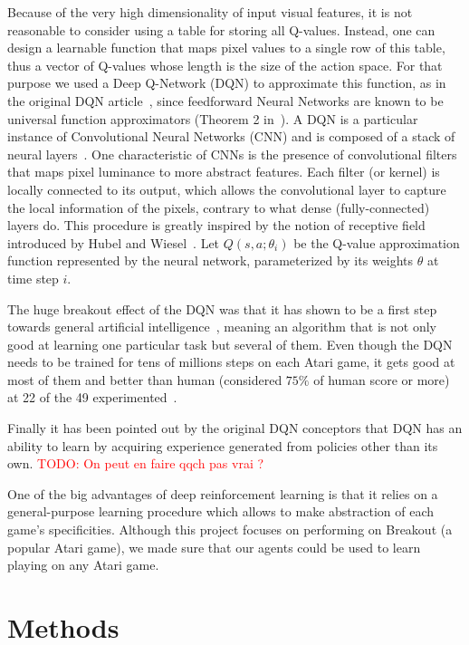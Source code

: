 \documentclass[letterpaper]{article}
\newcommand\todo[1]{\textcolor{red}{TODO: #1}}
\begin{document}
Because of the very high dimensionality of input visual features, it is not reasonable to consider using a table for storing all Q-values.
Instead, one can design a learnable function that maps pixel values to a single row of this table, thus a vector of Q-values whose length is the size
of the action space. For that purpose we used a Deep Q-Network (DQN) to approximate this function, as in the original DQN article~\citep{mnih2015human}, since feedforward Neural Networks
are known to be universal function approximators (Theorem 2 in~\cite{hornik1991approximation}).
A DQN is a particular instance of Convolutional Neural Networks (CNN) and is composed of a stack of neural layers~\citep{lecun1998gradient}. One characteristic of CNNs is the
presence of convolutional filters that maps pixel luminance to more abstract features. Each filter (or kernel) is locally connected to its output, which
allows the convolutional layer to capture the local information of the pixels, contrary to what dense (fully-connected) layers do. This procedure is greatly
inspired by the notion of receptive field introduced by Hubel and Wiesel~\citep{Hubel1962}.
Let $Q(s, a; \theta_i)$ be the Q-value approximation function represented by the neural network, parameterized by its weights $\theta$ at time step $i$.

The huge breakout effect of the DQN was that it has shown to be a first step towards general artificial intelligence~\citep{togelius2015ai}, meaning an
algorithm that is not only good at learning one particular task but several of them. Even though the DQN needs to be trained for tens of millions steps
on each Atari game, it gets good at most of them and better than human (considered $75\%$ of human score or more) at 22 of the 49 experimented~\citep{mnih2015human}.

Finally it has been pointed out by the original DQN conceptors that DQN has an ability to learn by acquiring experience generated from policies
other than its own. \todo{On peut en faire qqch pas vrai ?}

One of the big advantages of deep reinforcement learning is that it relies on a general-purpose learning procedure which allows to make
abstraction of each game's specificities. Although this project focuses on performing on Breakout (a popular Atari game), we made sure
that our agents could be used to learn playing on any Atari game.

\section{Methods}
\end{document}
